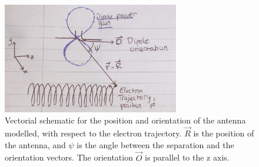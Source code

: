 \documentclass[a4paper,12pt, notitlepage]{article}
\begin{document}
\begin{figure}[t!]
\centering
\includegraphics[width=77mm]{pictures/antennaSetup.png}
\vspace{-2mm}
\caption{Vectorial schematic for the position and orientation of the antenna modelled, with respect to the electron trajectory. $\vec{R}$ is the position of the antenna, and $\psi$ is the angle between the separation and the orientation vectors. The orientation $\vec{O}$ is parallel to the z axis.}
\label{fig:antenaSetup}
\end{figure}
\end{document}
